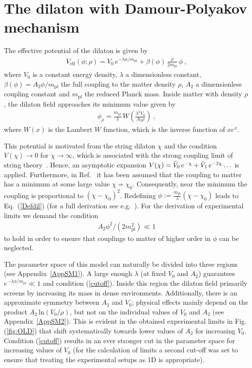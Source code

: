 \documentclass[aps,pra,twocolumn,floatfix,superscriptaddress,nofootinbib,showpacs,a4paper,balancelastpage,twoside]{revtex4-2}
\begin{document}
\section{The dilaton with Damour-Polyakov mechanism}

The effective potential of the dilaton  is given by~\cite{Brax:2018iyo}
\begin{align}
V_{\text{eff}}(\phi; \rho) = V_0\,e^{- \lambda \phi / m_{\text{pl}}}+    \beta(\phi)\,\frac{\rho}{2m_{\text{pl}}}\,\phi\>, \label{Defdil}
\end{align}
where $V_0$ is a constant energy density, $\lambda$ a dimensionless constant, $\beta(\phi) = A_2 \phi /m_{\text{pl}}$ the full coupling to the matter density $\rho$, $A_2$ a dimensionless coupling constant and $m_{\text{pl}}$ the reduced Planck mass. Inside matter with density $\rho$, the dilaton field approaches its minimum value given by
\begin{align}
\phi_{\rho} = \frac{m_{\text{pl}}}{\lambda}\, W\left(\frac{\lambda^2 V_0}{A_2 \rho}\right)\>, \label{minimum}
\end{align}
where $W(x)$ is the Lambert $W$ function, which is the inverse function of $xe^x$.

This potential is motivated from the string dilaton $\chi$ and the condition $V(\chi) \rightarrow 0$ for $\chi \rightarrow \infty$, which is associated with the strong coupling limit of string theory~\cite{Gasperini:2001pc}. Hence, an asymptotic expansion $V(\chi) = \Tilde{V}_0\,e^{- \chi } + \Tilde{V}_1\,e^{- 2\chi }\ldots$ is applied. Furthermore, in Ref.~\cite{Damour:1994zq} it has been assumed that the coupling to matter has a minimum at some large value $\chi=\chi_0$. Consequently, near the minimum the coupling is proportional to $(\chi-\chi_0)^2$. Redefining $\phi:=\frac{m_{\text{pl}}}{\lambda}(\chi-\chi_0)$ leads to Eq.~(\ref{Defdil}) (for a full derivation see e.g.~\cite{MarioHabil}). 
For the derivation of experimental limits we demand the condition  
\begin{align}
A_2 \phi^2/(2 m_{\text{pl}}^2) \ll 1\label{cutoff}
\end{align}
to hold in order to ensure that couplings to matter of higher order in $\phi$ can be neglected.

The parameter space of this model can naturally be divided into three regions (see Appendix~\ref{AppSM1}).
A large enough $\lambda$ (at fixed $V_0$ and $A_2$) guarantees $e^{-\lambda \phi / m_{\text{pl}}} \ll 1$ and condition (\ref{cutoff}).
Inside this region the dilaton field primarily screens by increasing its mass in dense environments. Additionally, there is an approximate symmetry between $A_2$ and $V_0$; physical effects mainly depend on the product $A_2\, \text{ln}(V_0/\rho)$, but not on the individual values of $V_0$ and $A_2$ (see Appendix~\ref{AppSM2}). This is evident in the obtained experimental limits in Fig. (\ref{fig:OLD}) that shift systematically towards lower values of $A_2$ for increasing $V_0$. Condition (\ref{cutoff}) results in an ever stronger cut in the parameter space for increasing values of $V_0$ (for the calculation of limits a second cut-off was set to ensure that treating the experimental setups as 1D is appropriate).
\end{document}
